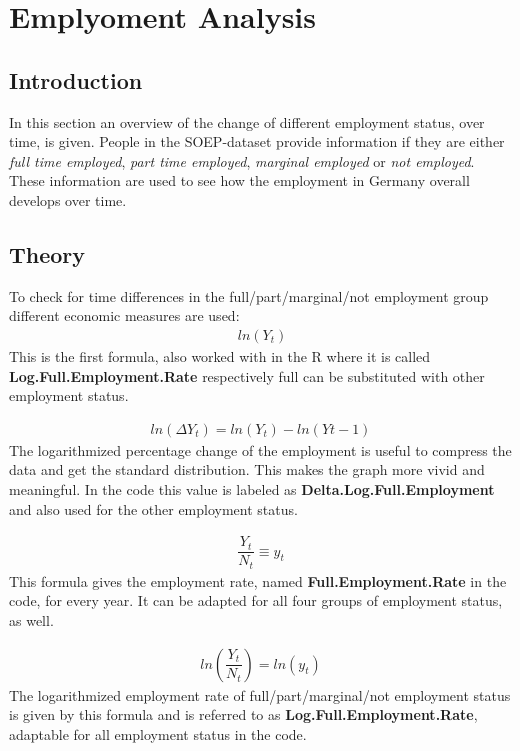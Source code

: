 \documentclass[a4paper]{article}
\begin{document}

\section{Emplyoment Analysis}
\subsection{Introduction}
In this section an overview of the change of different employment status, over time, is given. People in the SOEP-dataset provide information if they are either \textit{full time employed}, \textit{part time employed}, \textit{marginal employed} or \textit{not employed}. These information are used to see how the employment in Germany overall develops over time. 

\subsection{Theory}
To check for time differences in the full/part/marginal/not employment group different economic measures are used: 
\begin{align}
\ ln(Y_t)
\end{align}
This is the first formula, also worked with in the R where it is called \textbf{Log.Full.Employment.Rate} respectively full can be substituted with other employment status. 

\begin{align}
ln(\Delta Y_t)=ln(Y_t)-ln(Y{t-1})
\end{align}
The logarithmized percentage change of the employment is useful to compress the data and get the standard distribution. This makes the graph more vivid and meaningful. In the code this value is labeled as \textbf{Delta.Log.Full.Employment} and also used for the other employment status.  

\begin{align}
\dfrac{Y_t}{N_t}\equiv y_t
\end{align}
This formula gives the employment rate, named \textbf{Full.Employment.Rate} in the code, for every year. It can be adapted for all four groups of employment status, as well. 

\begin{align}
ln(\dfrac{Y_t}{N_t})= ln(y_t)
\end{align}
The logarithmized employment rate of full/part/marginal/not employment status is given by this formula and is referred to as \textbf{Log.Full.Employment.Rate}, adaptable for all employment status in the code. 
\end{document}
